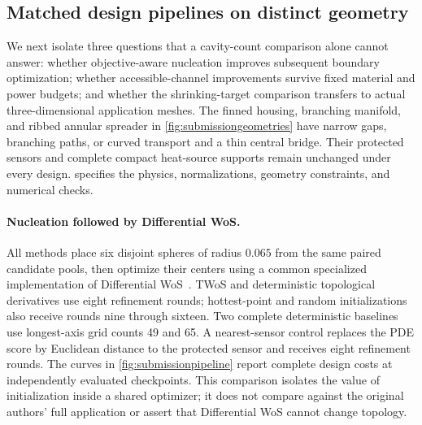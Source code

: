 \subsection{Matched design pipelines on distinct geometry}
\label{sec:submissionstudy}

We next isolate three questions that a cavity-count comparison alone cannot
answer: whether objective-aware nucleation improves subsequent boundary
optimization; whether accessible-channel improvements survive fixed material
and power budgets; and whether the shrinking-target comparison transfers to
actual three-dimensional application meshes. The finned housing, branching
manifold, and ribbed annular spreader in \cref{fig:submissiongeometries} have
narrow gaps, branching paths, or curved transport and a thin central bridge.
Their protected sensors and complete compact heat-source supports remain
unchanged under every design.  specifies the physics,
normalizations, geometry constraints, and numerical checks.



\paragraph{Nucleation followed by Differential WoS.}
All methods place six disjoint spheres of radius $0.065$ from the same paired
candidate pools, then optimize their centers using a common specialized
implementation of Differential WoS~\cite{miller2024differential}.
TWoS and deterministic topological derivatives use eight refinement rounds;
hottest-point and random initializations also receive rounds nine through
sixteen. Two complete deterministic baselines use longest-axis grid counts
49 and 65. A nearest-sensor control replaces the PDE score by Euclidean
distance to the protected sensor and receives eight refinement rounds. The curves in \cref{fig:submissionpipeline} report complete design
costs at independently evaluated checkpoints. This comparison isolates the
value of initialization inside a shared optimizer; it does not compare against
the original authors' full application or assert that Differential WoS cannot
change topology.

